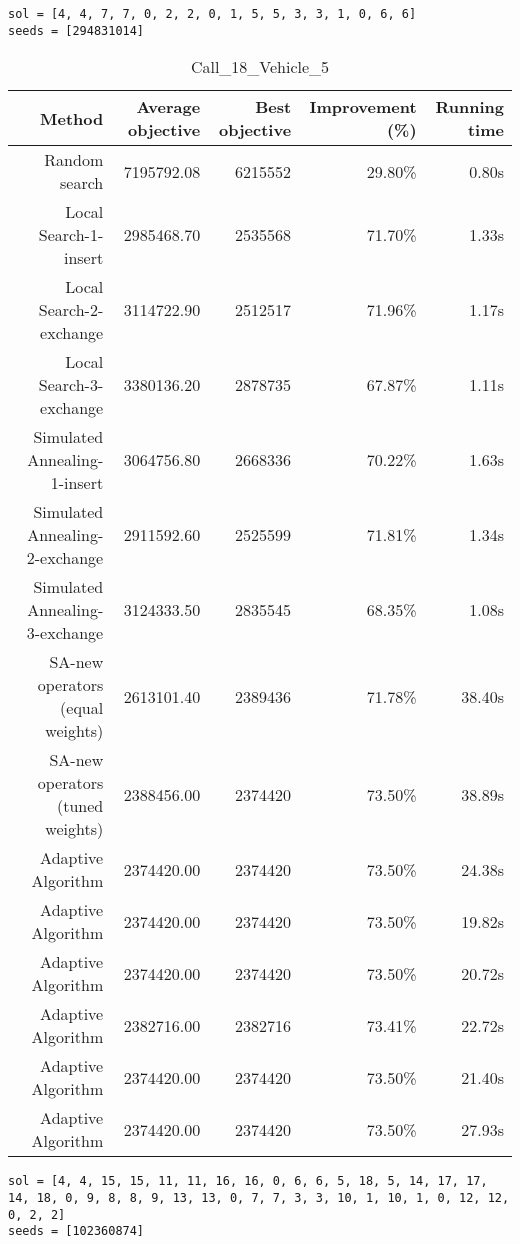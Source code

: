 \begin{lstlisting}[label={lst:call7vehicle3},caption=Optimal solution call\_7\_vehicle\_3]
sol = [4, 4, 7, 7, 0, 2, 2, 0, 1, 5, 5, 3, 3, 1, 0, 6, 6]
seeds = [294831014]
\end{lstlisting}%
\clearpage


\begin{table}[ht]
\centering
\caption{Call\_18\_Vehicle\_5}
\label{tab:call18vehicle5}
\begin{tabular}{|r|r|r|r|r|}
Method & Average objective & Best objective & Improvement (\%) & Running time \\
\hline
Random search & 7195792.08 & 6215552 & 29.80\% & 0.80s\\
Local Search-1-insert & 2985468.70 & 2535568 & 71.70\% & 1.33s\\
Local Search-2-exchange & 3114722.90 & 2512517 & 71.96\% & 1.17s\\
Local Search-3-exchange & 3380136.20 & 2878735 & 67.87\% & 1.11s\\
Simulated Annealing-1-insert & 3064756.80 & 2668336 & 70.22\% & 1.63s\\
Simulated Annealing-2-exchange & 2911592.60 & 2525599 & 71.81\% & 1.34s\\
Simulated Annealing-3-exchange & 3124333.50 & 2835545 & 68.35\% & 1.08s\\
SA-new operators (equal weights) & 2613101.40 & 2389436 & 71.78\% & 38.40s\\
SA-new operators (tuned weights) & 2388456.00 & 2374420 & 73.50\% & 38.89s\\
Adaptive Algorithm & 2374420.00 & 2374420 & 73.50\% & 24.38s\\
Adaptive Algorithm & 2374420.00 & 2374420 & 73.50\% & 19.82s\\
Adaptive Algorithm & 2374420.00 & 2374420 & 73.50\% & 20.72s\\
Adaptive Algorithm & 2382716.00 & 2382716 & 73.41\% & 22.72s\\
Adaptive Algorithm & 2374420.00 & 2374420 & 73.50\% & 21.40s\\
Adaptive Algorithm & 2374420.00 & 2374420 & 73.50\% & 27.93s\\
\end{tabular}%
\end{table}
\begin{lstlisting}[label={lst:call18vehicle5},caption=Optimal solution call\_18\_vehicle\_5]
sol = [4, 4, 15, 15, 11, 11, 16, 16, 0, 6, 6, 5, 18, 5, 14, 17, 17, 14, 18, 0, 9, 8, 8, 9, 13, 13, 0, 7, 7, 3, 3, 10, 1, 10, 1, 0, 12, 12, 0, 2, 2]
seeds = [102360874]
\end{lstlisting}%
\clearpage


